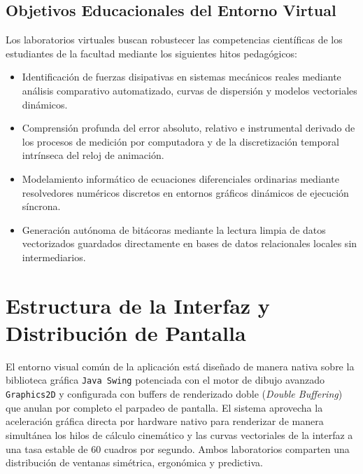 \documentclass[11pt,a4paper]{article}
\begin{document}
	\subsection{Objetivos Educacionales del Entorno Virtual}
	Los laboratorios virtuales buscan robustecer las competencias científicas de los estudiantes de la facultad mediante los siguientes hitos pedagógicos:
	\begin{itemize}
		\item Identificación de fuerzas disipativas en sistemas mecánicos reales mediante análisis comparativo automatizado, curvas de dispersión y modelos vectoriales dinámicos.
		\item Comprensión profunda del error absoluto, relativo e instrumental derivado de los procesos de medición por computadora y de la discretización temporal intrínseca del reloj de animación.
		\item Modelamiento informático de ecuaciones diferenciales ordinarias mediante resolvedores numéricos discretos en entornos gráficos dinámicos de ejecución síncrona.
		\item Generación autónoma de bitácoras mediante la lectura limpia de datos vectorizados guardados directamente en bases de datos relacionales locales sin intermediarios.
	\end{itemize}
	
	\section{Estructura de la Interfaz y Distribución de Pantalla}
	El entorno visual común de la aplicación está diseñado de manera nativa sobre la biblioteca gráfica \texttt{Java Swing} potenciada con el motor de dibujo avanzado \texttt{Graphics2D} y configurada con buffers de renderizado doble (\textit{Double Buffering}) que anulan por completo el parpadeo de pantalla. El sistema aprovecha la aceleración gráfica directa por hardware nativo para renderizar de manera simultánea los hilos de cálculo cinemático y las curvas vectoriales de la interfaz a una tasa estable de $60$ cuadros por segundo. Ambos laboratorios comparten una distribución de ventanas simétrica, ergonómica y predictiva.
	
\end{document}
